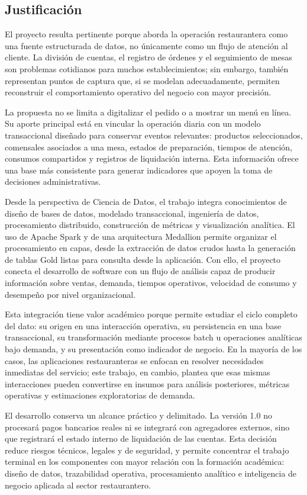 \newpage

\subsection{Justificación}

El proyecto resulta pertinente porque aborda la operación restaurantera como una fuente
estructurada de datos, no únicamente como un flujo de atención al cliente. La división de
cuentas, el registro de órdenes y el seguimiento de mesas son problemas cotidianos para
muchos establecimientos; sin embargo, también representan puntos de captura que, si se
modelan adecuadamente, permiten reconstruir el comportamiento operativo del negocio con
mayor precisión.

La propuesta no se limita a digitalizar el pedido o a mostrar un menú en línea. Su aporte
principal está en vincular la operación diaria con un modelo transaccional diseñado para
conservar eventos relevantes: productos seleccionados, comensales asociados a una mesa,
estados de preparación, tiempos de atención, consumos compartidos y registros de
liquidación interna. Esta información ofrece una base más consistente para generar
indicadores que apoyen la toma de decisiones administrativas.

Desde la perspectiva de Ciencia de Datos, el trabajo integra conocimientos de diseño de
bases de datos, modelado transaccional, ingeniería de datos, procesamiento distribuido,
construcción de métricas y visualización analítica. El uso de Apache Spark y de una
arquitectura Medallion permite organizar el procesamiento en capas, desde la extracción de
datos crudos hasta la generación de tablas Gold listas para consulta desde la aplicación. Con
ello, el proyecto conecta el desarrollo de software con un flujo de análisis capaz de producir
información sobre ventas, demanda, tiempos operativos, velocidad de consumo y desempeño por
nivel organizacional.

Esta integración tiene valor académico porque permite estudiar el ciclo completo del dato:
su origen en una interacción operativa, su persistencia en una base transaccional, su
transformación mediante procesos batch u operaciones analíticas bajo demanda, y su presentación
como indicador de negocio. En la mayoría de los casos, las aplicaciones restauranteras se enfocan
en resolver necesidades inmediatas del servicio; este trabajo, en cambio, plantea que esas mismas
interacciones pueden convertirse en insumos para análisis posteriores, métricas operativas y
estimaciones exploratorias de demanda.

El desarrollo conserva un alcance práctico y delimitado. La versión 1.0 no procesará pagos
bancarios reales ni se integrará con agregadores externos, sino que registrará el estado
interno de liquidación de las cuentas. Esta decisión reduce riesgos técnicos, legales y de
seguridad, y permite concentrar el trabajo terminal en los componentes con mayor relación
con la formación académica: diseño de datos, trazabilidad operativa, procesamiento analítico
e inteligencia de negocio aplicada al sector restaurantero.
